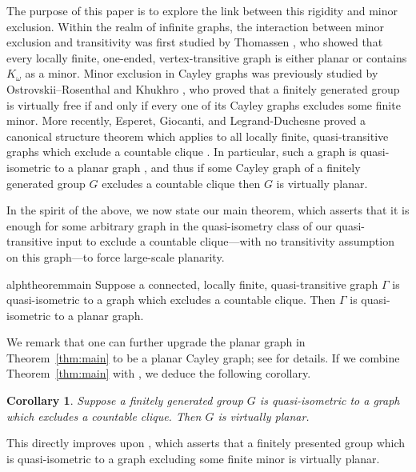 \documentclass[10pt,a4paper]{amsart}
\newtheorem{alphcor}[alphtheorem]{Corollary}
\theoremstyle{definition}
\begin{document}
The purpose of this paper is to explore the link between this rigidity and minor exclusion. 
Within the realm of infinite graphs, the interaction between minor exclusion and transitivity was first studied by Thomassen \cite{Tho92}, who showed that every locally finite, one-ended, vertex-transitive graph is either planar or contains $K_{\omega}$ as a minor. Minor exclusion in Cayley graphs was previously studied by Ostrovskii–Rosenthal \cite{OR15} and Khukhro \cite{Khu23}, who proved that a finitely generated group is virtually free if and only if every one of its Cayley graphs excludes some finite minor.
More recently, Esperet, Giocanti, and Legrand-Duchesne proved a canonical structure theorem which applies to all locally finite, quasi-transitive graphs which exclude a countable clique \cite{esperet2024structure}. In particular, such a graph is quasi-isometric to a planar graph \cite{Esperet_Giocanti_2024}, and thus if some Cayley graph of a finitely generated group $G$ excludes a countable clique then $G$ is virtually planar. 

In the spirit of the above, we now state our main theorem, which asserts that it is enough for some arbitrary graph in the quasi-isometry class of our quasi-transitive input to exclude a countable clique---with no transitivity assumption on this graph---to force large-scale planarity.

\begin{restatable}{alphtheorem}{main}\label{thm:main}
    Suppose a connected, locally finite, quasi-transitive graph $\Gamma$
    is quasi-isometric to a graph which excludes a countable clique.
    Then $\Gamma$ is quasi-isometric to a planar graph.
\end{restatable}

We remark that one can further upgrade
the planar graph in Theorem~\ref{thm:main} to be a planar Cayley graph;
see \cite{macmanus2024note} for details. 
If we combine Theorem~\ref{thm:main} with
\cite[Cor.~D]{macmanus2023accessibility}, we deduce the following corollary.

\begin{alphcor}\label{cor:planar-rigidity}
    Suppose a finitely generated group $G$ is quasi-isometric to a graph
    which excludes a countable clique. Then $G$ is virtually planar.
\end{alphcor}

This directly improves upon \cite[Cor.~B]{macmanus2025fat}, which asserts that a finitely presented group which is quasi-isometric to a graph excluding some finite minor is virtually planar. 
\end{document}
